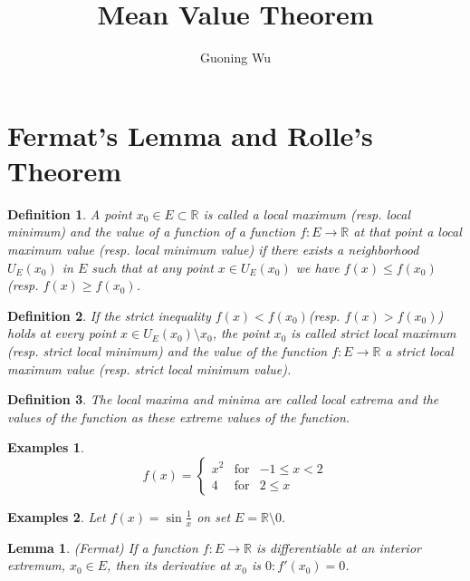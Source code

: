 \documentclass[a4paper,12pt]{article} %
\title{Mean Value Theorem}
\author{Guoning Wu}
\newtheorem{definition}{Definition}[section]
\newtheorem{lemma}[theorem]{Lemma}
\newtheorem{example}{Examples}
\begin{document}
\tableofcontents
\setcounter{tocdepth}{2}
\listoffigures
\listoftables
\maketitle

\theoremstyle{definition}

\section{Fermat's Lemma and Rolle's Theorem}
\begin{definition}
    \normalfont A point $x_0 \in E \subset \mathbb{R}$ is called a local maximum (resp. local minimum) and 
    the value of a function of a function $f: E \to \mathbb{R}$ at that point a local 
    maximum value (resp. local minimum value) if there exists a neighborhood $U_E(x_0)$
    in $E$ such that at any point $x \in U_E(x_0)$ we have $f(x) \le f(x_0)$ (resp. $f(x) \ge f(x_0)$.
\end{definition}

\begin{definition}
    \normalfont If the strict inequality $f(x) < f(x_0)$(resp. $f(x) > f(x_0)$) holds at every point 
    $x \in U_E(x_0)\setminus x_0$, the point $x_0$ is called strict local maximum (resp. strict local
    minimum) and the value of the function $f: E \to \mathbb{R}$ a strict local maximum 
    value (resp. strict local minimum value).
\end{definition}

\begin{definition}
    \normalfont The local maxima and minima are called local extrema and the values of the function
    as these extreme values of the function.
\end{definition}

\begin{example}
    \[
        f(x) = \left\{\begin{array}{rcl} x^2 & \mbox{for} & -1 \le x < 2\\
                                   4  & \mbox{for} & 2 \le x
                \end{array} \right.
                \]
\end{example}

\begin{example}
    Let $f(x) = \sin \frac{1}{x}$ on set $E = \mathbb{R}\setminus 0.$
\end{example}

\begin{lemma}{\mbox{(Fermat)}}
    \normalfont If a function $f: E \to \mathbb{R}$ is differentiable at an interior 
    extremum, $x_0 \in E$, then its derivative at $x_0$ is $0: f'(x_0) = 0$.
\end{lemma}
\end{document}
